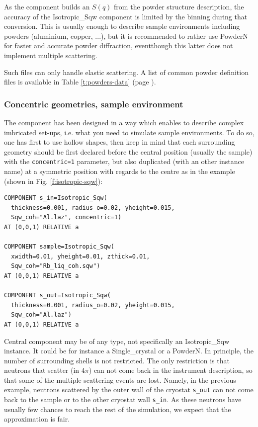As the component builds an $S(q)$ from the powder structure description, the accuracy of the Isotropic\_Sqw component is limited by the binning during that conversion. This is usually enough to describe sample environments including powders (aluminium, copper, ...), but it is recommended to rather use PowderN for faster and accurate powder diffraction, eventthough this latter does not implement multiple scattering.

Such files can only handle elastic scattering. A list of common powder definition files is available in Table \ref{t:powders-data} (page \pageref{t:powders-data}).

\subsubsection{Concentric geometries, sample environment}

The component has been designed in a way which enables to describe complex imbricated set-ups, i.e. what you need to simulate sample environments. To do so, one has first to use hollow shapes, then keep in mind that each surrounding geometry should be first declared before the central position (usually the sample) with the \verb+concentric=1+ parameter, but also duplicated (with an other instance name) at a symmetric position with regards to the centre as in the example (shown in Fig. \ref{f:isotropic-sqw}):
\begin{verbatim}
COMPONENT s_in=Isotropic_Sqw(
  thickness=0.001, radius_o=0.02, yheight=0.015,
  Sqw_coh="Al.laz", concentric=1)
AT (0,0,1) RELATIVE a

COMPONENT sample=Isotropic_Sqw(
  xwidth=0.01, yheight=0.01, zthick=0.01,
  Sqw_coh="Rb_liq_coh.sqw")
AT (0,0,1) RELATIVE a

COMPONENT s_out=Isotropic_Sqw(
  thickness=0.001, radius_o=0.02, yheight=0.015,
  Sqw_coh="Al.laz")
AT (0,0,1) RELATIVE a
\end{verbatim}
Central component may be of any type, not specifically an Isotropic\_Sqw instance. It could be for instance a Single\_crystal or a PowderN.
In principle, the number of surrounding shells is not restricted.
The only restriction is that neutrons that scatter (in $4\pi$) can not come back in the instrument description, so that some of the multiple scattering events are lost. Namely, in the previous example, neutrons scattered by the outer wall of the cryostat \verb+s_out+ can not come back to the sample or to the other cryostat wall \verb+s_in+. As these neutrons have usually few chances to reach the rest of the simulation, we expect that the approximation is fair.


